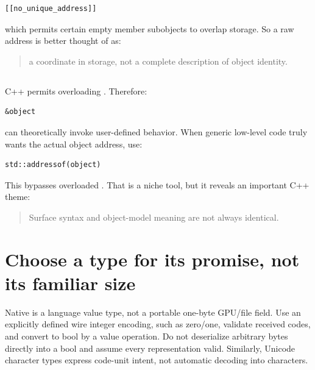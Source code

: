\begin{verbatim}
[[no_unique_address]]
\end{verbatim}

which permits certain empty member subobjects to overlap storage. So a raw address is better thought of as:

\begin{quote}
a coordinate in storage, not a complete description of object identity.
\end{quote}

\subsection{\texorpdfstring{}{}}\label{01-foundations-i-ch002-stdaddressof}

\hypertarget{01-foundations-i-ch002-stdaddressof}{}

C++ permits overloading . Therefore:

\begin{verbatim}
&object
\end{verbatim}

can theoretically invoke user-defined behavior. When generic low-level code truly wants the actual object address, use:

\begin{verbatim}
std::addressof(object)
\end{verbatim}

This bypasses overloaded . That is a niche tool, but it reveals an important C++ theme:

\begin{quote}
Surface syntax and object-model meaning are not always identical.
\end{quote}

\section{Choose a type for its promise, not its familiar size}\label{01-foundations-i-ch002-choose-a-type-for-its-promise-not-its-familiar-size}

\hypertarget{01-foundations-i-ch002-choose-a-type-for-its-promise-not-its-familiar-size}{}

Native  is a language value type, not a portable one-byte GPU/file field. Use an explicitly defined wire integer encoding, such as zero/one, validate received codes, and convert to bool by a value operation. Do not deserialize arbitrary bytes directly into a bool and assume every representation valid. Similarly, Unicode character types express code-unit intent, not automatic decoding into characters.

